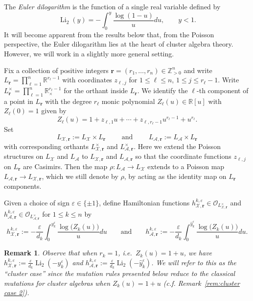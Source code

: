 \documentclass{amsart}
\newtheorem{remark}[theorem]{Remark}
\numberwithin{equation}{section}
\newcommand{\bfr}{{\boldsymbol{r}}}
\newcommand{\cA}{\mathcal{A}}
\newcommand{\cO}{\mathcal{O}}
\newcommand{\cX}{\mathcal{X}}
\newcommand{\RR}{\mathbb{R}}
\newcommand{\ZZ}{\mathbb{Z}}
\newcommand{\Li}{\operatorname{Li}}
\begin{document}
The \emph{Euler dilogarithm} is the function of a single real variable defined by
\[\Li_2(y)=-\int_0^y \frac{\log(1-u)}{u}du,\qquad y<1.\]
It will become apparent from the results below that, from the Poisson perspective, the Euler dilogarithm lies at the heart of cluster algebra theory.
However, we will work in a slightly more general setting.

Fix a collection of positive integers $\bfr=(r_1,\ldots,r_n)\in\ZZ_{>0}^n$ and write $L_\bfr=\prod_{\ell=1}^n \RR^{r_\ell-1}$ with coordinates $z_{\ell,j}$ for $1\le\ell\le n$, $1\le j\le r_\ell-1$.
Write $L^\times_\bfr=\prod_{\ell=1}^n \RR_\times^{r_\ell-1}$ for the orthant inside $L_\bfr$.
We identify the $\ell$-th component of a point in $L_\bfr$ with the degree $r_\ell$ monic polynomial $Z_\ell(u)\in\RR[u]$ with $Z_\ell(0)=1$ given by
\[Z_\ell(u)=1+z_{\ell,1}u+\cdots+z_{\ell,r_\ell-1}u^{r_\ell-1}+u^{r_\ell}.\]
Set 
\[L_{\cX,\bfr}:=L_\cX\times L_\bfr\qquad\text{ and }\qquad L_{\cA,\bfr}:=L_\cA\times L_\bfr\]
with corresponding orthants $L^\times_{\cX,\bfr}$ and $L^\times_{\cA,\bfr}$.
Here we extend the Poisson structures on $L_\cX$ and $L_\cA$ to $L_{\cX,\bfr}$ and $L_{\cA,\bfr}$ so that the coordinate functions $z_{\ell,j}$ on $L_\bfr$ are Casimirs. 
Then the map $\rho:L_\cA\to L_\cX$ extends to a Poisson map $L_{\cA,\bfr}\to L_{\cX,\bfr}$, which we still denote by $\rho$, by acting as the identity map on $L_\bfr$ components.

Given a choice of sign $\varepsilon\in\{\pm1\}$, define Hamiltonian functions $h^{k,\varepsilon}_{\cX,\bfr}\in\cO_{L^\times_{\cX,\bfr}}$ and $h^{k,\varepsilon}_{\cA,\bfr}\in\cO_{L^\times_{\cA,\bfr}}$ for $1\le k\le n$ by
\begin{equation}
  \label{eq:hamiltonians}
  h_{\cX,\bfr}^{k,\varepsilon}:=-\frac{\varepsilon}{d_k}\int_0^{y_k^\varepsilon} \frac{\log\big(Z_k(u)\big)}{u}du\qquad\text{and}\qquad h_{\cA,\bfr}^{k,\varepsilon}:=-\frac{\varepsilon}{d_k}\int_0^{\hat y_k^\varepsilon} \frac{\log\big(Z_k(u)\big)}{u}du.
\end{equation}
\begin{remark}
  \label{rem:cluster case}
  Observe that when $r_k=1$, i.e.\ $Z_k(u)=1+u$, we have $h_{\cX,\bfr}^{k,\varepsilon}:=\frac{\varepsilon}{d_k}\Li_2(-y_k^\varepsilon)$ and $h_{\cA,\bfr}^{k,\varepsilon}:=\frac{\varepsilon}{d_k}\Li_2(-\hat y_k^\varepsilon)$.
  We will refer to this as the ``cluster case'' since the mutation rules presented below reduce to the classical mutations for cluster algebras when $Z_k(u)=1+u$ (c.f. Remark~\ref{rem:cluster case 2}).
\end{remark}
\end{document}
